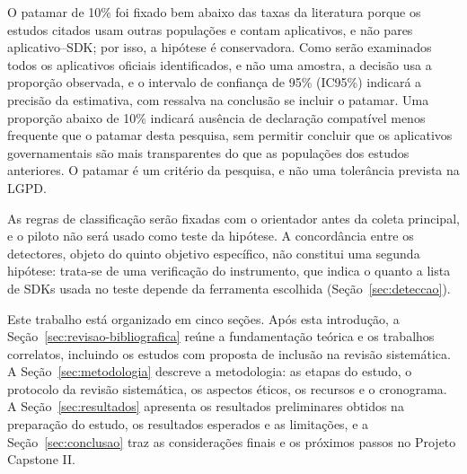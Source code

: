 O patamar de 10\% foi fixado bem abaixo das taxas da literatura porque os estudos citados usam outras populações e contam aplicativos, e não pares aplicativo--SDK; por isso, a hipótese é conservadora. Como serão examinados todos os aplicativos oficiais identificados, e não uma amostra, a decisão usa a proporção observada, e o intervalo de confiança de 95\% (IC95\%) indicará a precisão da estimativa, com ressalva na conclusão se incluir o patamar. Uma proporção abaixo de 10\% indicará ausência de declaração compatível menos frequente que o patamar desta pesquisa, sem permitir concluir que os aplicativos governamentais são mais transparentes do que as populações dos estudos anteriores. O patamar é um critério da pesquisa, e não uma tolerância prevista na LGPD.

As regras de classificação serão fixadas com o orientador antes da coleta principal, e o piloto não será usado como teste da hipótese. A concordância entre os detectores, objeto do quinto objetivo específico, não constitui uma segunda hipótese: trata-se de uma verificação do instrumento, que indica o quanto a lista de SDKs usada no teste depende da ferramenta escolhida (Seção~\ref{sec:deteccao}).

\label{sec:estrutura}

Este trabalho está organizado em cinco seções. Após esta introdução, a Seção~\ref{sec:revisao-bibliografica} reúne a fundamentação teórica e os trabalhos correlatos, incluindo os estudos com proposta de inclusão na revisão sistemática. A Seção~\ref{sec:metodologia} descreve a metodologia: as etapas do estudo, o protocolo da revisão sistemática, os aspectos éticos, os recursos e o cronograma. A Seção~\ref{sec:resultados} apresenta os resultados preliminares obtidos na preparação do estudo, os resultados esperados e as limitações, e a Seção~\ref{sec:conclusao} traz as considerações finais e os próximos passos no Projeto Capstone II.
